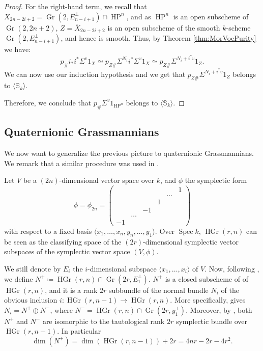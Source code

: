 \documentclass[10pt]{amsart}
\theoremstyle{definition}
\theoremstyle{plain}
\numberwithin{equation}{section}
\newcommand{\0}{\emptyset}
\newcommand{\Gr}{{\operatorname{Gr}}}
\newcommand{\HGr}{{\operatorname{HGr}}}
\newcommand{\HP}{{\operatorname{HP}}}
\newcommand{\Spec}{{\operatorname{Spec}}}
\renewcommand{\dim}{{\operatorname{dim}}}
\begin{document}
\begin{proof}
 For the right-hand term, we recall that $\overline{X}_{2n-2i+2}=\Gr(2, E_{n-i+1}^\perp)\cap \HP^n$, and as $\HP^n$ is an open subscheme of $\Gr(2,2n+2)$, $Z=\overline{X}_{2n-2i+2}$ is an open subscheme of the smooth $k$-scheme $\Gr(2, E_{n-i+1}^\perp)$, and hence is smooth. Thus, by Theorem \ref{thm:MorVoePurity} we have:
 $$p_{\#}i_*i^*\Sigma^v1_X \simeq p_{Z\#}\Sigma^{N_i}i^*\Sigma^v1_X \simeq p_{Z\#}\Sigma^{N_i+i^*v}1_Z.$$
We can now use our induction hypothesis and we get that $p_{Z\#}\Sigma^{N_i + i^*v}1_Z$ belongs to $\langle \mathbb{S}_k \rangle$.

 Therefore, we conclude that $p_{\#}\Sigma^v1_{\HP^n}$ belongs to $\langle \mathbb{S}_k \rangle$.
\end{proof}

\subsection{Quaternionic Grassmannians}

We now want to generalize the previous picture to quaternionic Grassmannians. We remark that a similar procedure was used in \cite[Proposition 3.1]{Rond:Cellularity}.

 Let $V$ be a $(2n)$-dimensional vector space over $k$, and $\phi$ the symplectic form
  $$\phi = \phi_{2n}=
\begin{pmatrix}
     & & &  &  & 1\\
     & &  &  &\ldots & \\
     & & & 1& &\\
     & & -1 &  & &  \\
     & \ldots &  & & & \\
     -1 & & & & &
\end{pmatrix}$$
with respect to a fixed basis $\langle x_1, \ldots, x_n,y_n, \ldots, y_1 \rangle$.
Over $\Spec k$, $\HGr(r,n)$ can be seen as the classifying space of the $(2r)$-dimensional symplectic vector subspaces of the symplectic vector space $(V,\phi)$. 

We still denote by $E_i$ the $i$-dimensional subspace $\langle x_1, \ldots , x_i \rangle$ of $V$. Now, following \cite[Theorem 4.1]{panwal:grass}, we define $N^+\coloneqq \HGr(r,n)\cap \Gr(2r,E_1^{\perp})$. $N^+$ is a closed subscheme of of $\HGr(r,n)$, and it is a rank $2r$ subbundle of the normal bundle $N_i$ of the obvious inclusion $i:\HGr(r,n-1) \to \HGr(r,n)$. More specifically, \cite[Theorem 4.1 (b)]{panwal:grass} gives $N_i=N^+\oplus N^-$, where $N^-=\HGr(r,n)\cap \Gr(2r,y_1^{\perp})$. Moreover, by \cite[Theorem 4.1 (c)]{panwal:grass}, both $N^+$ and $N^-$ are isomorphic to the tautological rank $2r$ symplectic bundle over $\HGr(r,n-1)$. In particular
$$\dim(N^+)=\dim(\HGr(r,n-1))+2r=4nr-2r-4r^2.$$
\end{document}
